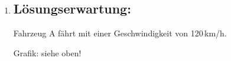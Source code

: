 \begin{langesbeispiel}
{\begin{enumerate}
ein möglicher Prozentsatz: 25\,\%\\
Toleranzintervall: $(20\,\%;25\,\%]$

Mögliche Begründung:\\
Der Tiefenabstand von zwei Sekunden liegt zwischen dem Median und dem dritten Quartil.\leer

Mögliche Vorgehensweise:\\
Zufallsvariable $X=$ Anzahl der Kraftfahrlenker/innen, die den empfohlenen Mindestabstand eingehalten haben

$p=0,25$ ... Wahrscheinlichkeit, dass der empfohlene Mindestabstand eingehalten wurden\\
$n=10$ ... Anzahl der ausgewählten Messungen\\
$P(X\geq 6)\approx 0,0197$

\item \subsection{Lösungserwartung:}

Fahrzeug A fährt mit einer Geschwindigkeit von 120\,km/h.

Grafik: siehe oben!
\end{enumerate}}
	
	\end{langesbeispiel}
